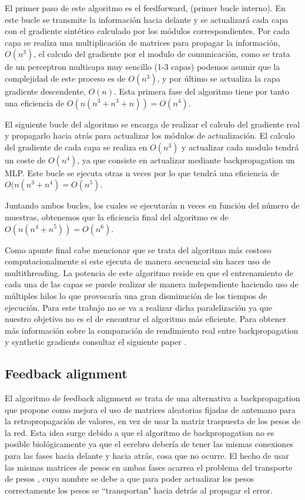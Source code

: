 El primer paso de este algoritmo es el feedforward, (primer bucle interno). En este bucle se transmite la información hacia delante y se actualizará cada capa con el gradiente sintético calculado por los módulos correspondientes. Por cada capa se realiza una multiplicación de matrices para propagar la información, $O(n^{3})$, el calculo del gradiente por el modulo de comunicación, como se trata de un perceptron multicapa muy sencillo (1-3 capas) podemos asumir que la complejidad de este proceso es de $O(n^{3})$, y por último se actualiza la capa gradiente descendente, $O(n)$. Esta primera fase del algoritmo tiene por tanto una eficiencia de $O(n(n^{3}+n^{3}+n))=O(n^{4})$.

El siguiente bucle del algoritmo se encarga de realizar el calculo del gradiente real y propagarlo hacia atrás para actualizar los módulos de actualización. El calculo del gradiente de cada capa se realiza en $O(n^3)$ y actualizar cada modulo tendrá un coste de $O(n^{4})$, ya que consiste en actualizar mediante backpropagation un MLP. Este bucle se ejecuta otras n veces por lo que tendrá una eficiencia de $O(n(n^3+n^4) = O(n^5)$.

Juntando ambos bucles, los cuales se ejecutarán n veces en función del número de muestras, obtenemos que la eficiencia final del algoritmo es de $O(n(n^4+n^5)) = O(n^6)$. 

Como apunte final cabe mencionar que se trata del algoritmo más costoso computacionalmente si este ejecuta de manera secuencial sin hacer uso de multithreading. La potencia de este algoritmo reside en que el entrenamiento de cada una de las capas se puede realizar de manera independiente haciendo uso de múltiples hilos lo que provocaría una gran disminución de los tiempos de ejecución. Para este trabajo no se va a realizar dicha paralelización ya que nuestro objetivo no es el de encontrar el algoritmo más eficiente. Para obtener más información sobre la comparación de rendimiento real entre backpropagation y synthetic gradients consultar el siguiente paper \cite{RefWorks:RefID:14-bisong2017benchmarking}.




\subsection{Feedback alignment}

El algoritmo de feedback alignment se trata de una alternativa a backpropagation que propone como mejora el uso de matrices aleatorias fijadas de antemano para la retropropagación de valores, en vez de usar la matriz traspuesta de los pesos de la red. Esta idea surge debido a que el algoritmo de backpropagation no es posible biológicamente ya que el cerebro debería de tener las mismas conexiones para las fases hacia delante y hacia atrás, cosa que no ocurre. El hecho de usar las mismas matrices de pesos en ambas fases acarrea el problema del transporte de pesos \cite{RefWorks:RefID:10-grossberg1987competitive}, cuyo nombre se debe a que para poder actualizar los pesos correctamente los pesos se ``transportan" hacia detrás al propagar el error. 

